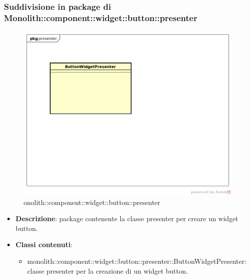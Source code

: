 \subsubsection{Suddivisione in package  di Monolith::component::widget::button::presenter}
\label{monolith::component::widget::button::presenter}
\begin{figure}[H]
	\centering
	\includegraphics[scale=0.5]{Sezioni/imgPackage/component_widget_button_presenter.png}
	\caption{onolith::component::widget::button::presenter}
\end{figure}
\begin{itemize}
	\item{\textbf{Descrizione}}: package contenente la classe presenter per creare un widget button.
	\item{\textbf{Classi contenuti}}:
	\begin{itemize}
	\item{monolith::component::widget::button::presenter::ButtonWidgetPresenter}: classe presenter per la creazione di un widget button.
	\end{itemize}
\end{itemize}



